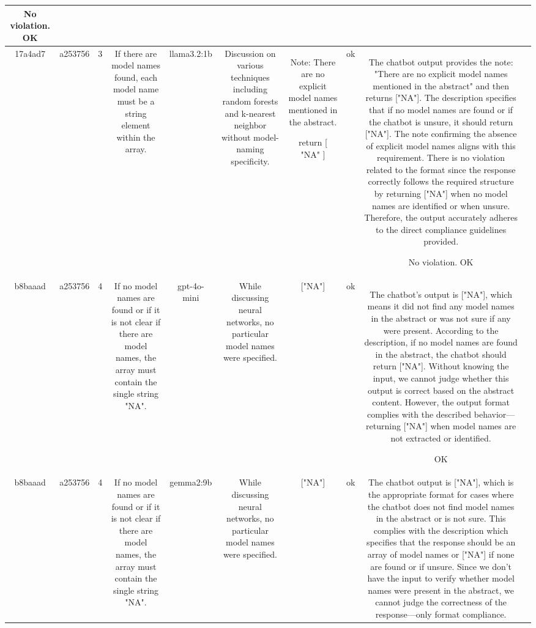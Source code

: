 \begin{table}[h!]
\begin{tabular}{|c|c|c|c|c|c|c|c|c|c|}
No violation.
OK & \\
\hline
17a4ad7 & a253756 & 3 & If there are model names found, each model name must be a string element within the array. & llama3.2:1b & Discussion on various techniques including random forests and k-nearest neighbor without model-naming specificity. & Note: There are no explicit model names mentioned in the abstract.

return [ "NA" ] & ok & The chatbot output provides the note: "There are no explicit model names mentioned in the abstract" and then returns ["NA"]. The description specifies that if no model names are found or if the chatbot is unsure, it should return ["NA"]. The note confirming the absence of explicit model names aligns with this requirement. There is no violation related to the format since the response correctly follows the required structure by returning ["NA"] when no model names are identified or when unsure. Therefore, the output accurately adheres to the direct compliance guidelines provided.

No violation.
OK & \\
\hline
b8baaad & a253756 & 4 & If no model names are found or if it is not clear if there are model names, the array must contain the single string "NA". & gpt-4o-mini & While discussing neural networks, no particular model names were specified. & ["NA"] & ok & The chatbot's output is ["NA"], which means it did not find any model names in the abstract or was not sure if any were present. According to the description, if no model names are found in the abstract, the chatbot should return ["NA"]. Without knowing the input, we cannot judge whether this output is correct based on the abstract content. However, the output format complies with the described behavior—returning ["NA"] when model names are not extracted or identified.

OK & \\
\hline
b8baaad & a253756 & 4 & If no model names are found or if it is not clear if there are model names, the array must contain the single string "NA". & gemma2:9b & While discussing neural networks, no particular model names were specified. & ["NA"] 
 & ok & The chatbot output is ["NA"], which is the appropriate format for cases where the chatbot does not find model names in the abstract or is not sure. This complies with the description which specifies that the response should be an array of model names or ["NA"] if none are found or if unsure. Since we don't have the input to verify whether model names were present in the abstract, we cannot judge the correctness of the response—only format compliance.


\end{tabular}
\end{table}
